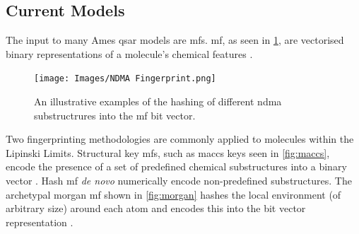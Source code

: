 \subsection{Current Models}
The input to many Ames \gls{qsar} models are \glspl{mf}. \gls{mf}, as seen in \cref{fig:ndma_fp}, are vectorised binary representations of a molecule’s chemical features \cite{capecchi_one_2020}. 

\begin{figure}[H]
    \centering
    \texttt{[image: Images/NDMA Fingerprint.png]}
    \caption{An illustrative examples of the hashing of different \gls{ndma} substructrures into the \gls{mf} bit vector.}
    \label{fig:ndma_fp}
\end{figure}

Two fingerprinting methodologies are commonly applied to molecules within the Lipinski Limits. 
Structural key \glspl{mf}, such as \gls{maccs} keys seen in \cref{fig:maccs}, encode the presence of a set of predefined chemical substructures into a binary vector \cite{durant_reoptimization_2002, seo_development_2020}.
Hash \gls{mf} \textit{de novo} numerically encode non-predefined substructures. The archetypal \gls{morgan} \gls{mf} shown in \cref{fig:morgan} hashes the local environment (of arbitrary size) around each atom and encodes this into the bit vector representation \cite{rogers_extended-connectivity_2010}.

